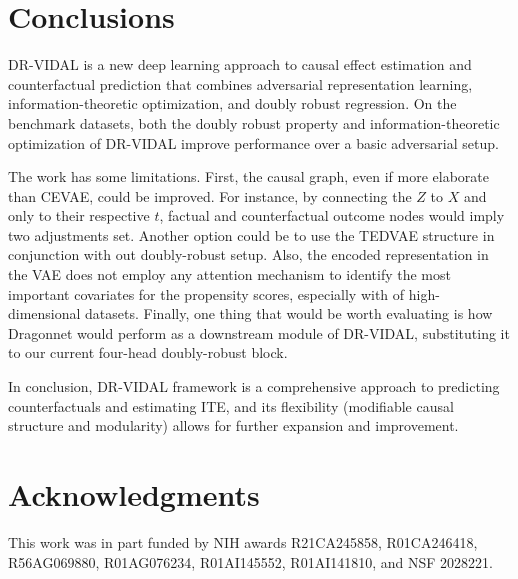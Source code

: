 \documentclass{amia}
\begin{document}
\section*{Conclusions}
DR-VIDAL is a new deep learning approach to causal effect estimation and counterfactual prediction that combines adversarial representation learning, information-theoretic optimization, and doubly robust regression. On the benchmark datasets, both the doubly robust property and information-theoretic optimization of DR-VIDAL improve performance over a basic adversarial setup.

The work has some limitations. First, the causal graph, even if more elaborate than CEVAE, could be improved. For instance, by connecting the $Z$ to $X$ and only to their respective $t$, factual and counterfactual outcome nodes would imply two adjustments set. Another option could be to use the TEDVAE structure in conjunction with out doubly-robust setup. Also, the encoded representation in the VAE does not employ any attention mechanism to identify the most important covariates for the propensity scores, especially with of high-dimensional datasets. Finally, one thing that would be worth evaluating is how Dragonnet would perform as a downstream module of DR-VIDAL, substituting it to our current four-head doubly-robust block.

In conclusion, DR-VIDAL framework is a comprehensive approach to predicting counterfactuals and estimating ITE, and its flexibility (modifiable causal structure and modularity) allows for further expansion and improvement. 


\section*{Acknowledgments} This work was in part funded by NIH awards R21CA245858, R01CA246418, R56AG069880, R01AG076234, R01AI145552, R01AI141810, and NSF 2028221.




\end{document}
